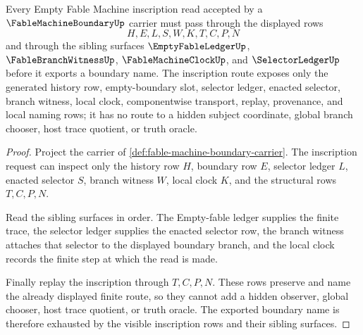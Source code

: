 \begin{theorem}
\label{thm:fable-machine-boundary-inscription-nonescape}
Every Empty Fable Machine inscription read accepted by a $\FableMachineBoundaryUp$ carrier must pass through the displayed rows
$$
H,E,L,S,W,K,T,C,P,N
$$
and through the sibling surfaces $\EmptyFableLedgerUp$, $\FableBranchWitnessUp$, $\FableMachineClockUp$, and $\SelectorLedgerUp$ before it exports a boundary name. The inscription route exposes only the generated history row, empty-boundary slot, selector ledger, enacted selector, branch witness, local clock, componentwise transport, replay, provenance, and local naming rows; it has no route to a hidden subject coordinate, global branch chooser, host trace quotient, or truth oracle.
\end{theorem}
\begin{proof}
Project the carrier of \autoref{def:fable-machine-boundary-carrier}. The inscription request can inspect only the history row $H$, boundary row $E$, selector ledger $L$, enacted selector $S$, branch witness $W$, local clock $K$, and the structural rows $T,C,P,N$.

Read the sibling surfaces in order. The Empty-fable ledger supplies the finite trace, the selector ledger supplies the enacted selector row, the branch witness attaches that selector to the displayed boundary branch, and the local clock records the finite step at which the read is made.

Finally replay the inscription through $T,C,P,N$. These rows preserve and name the already displayed finite route, so they cannot add a hidden observer, global chooser, host trace quotient, or truth oracle. The exported boundary name is therefore exhausted by the visible inscription rows and their sibling surfaces.
\end{proof}


